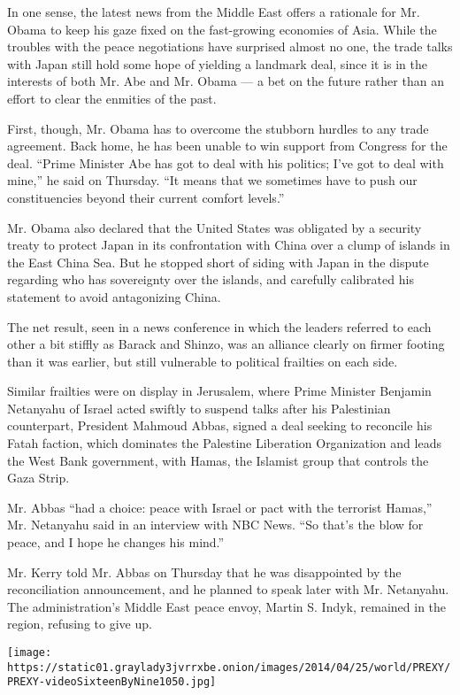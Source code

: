 In one sense, the latest news from the Middle East offers a rationale
for Mr. Obama to keep his gaze fixed on the fast-growing economies of
Asia. While the troubles with the peace negotiations have surprised
almost no one, the trade talks with Japan still hold some hope of
yielding a landmark deal, since it is in the interests of both Mr. Abe
and Mr. Obama --- a bet on the future rather than an effort to clear the
enmities of the past.

First, though, Mr. Obama has to overcome the stubborn hurdles to any
trade agreement. Back home, he has been unable to win support from
Congress for the deal. ``Prime Minister Abe has got to deal with his
politics; I've got to deal with mine,'' he said on Thursday. ``It means
that we sometimes have to push our constituencies beyond their current
comfort levels.''

Mr. Obama also declared that the United States was obligated by a
security treaty to protect Japan in its confrontation with China over a
clump of islands in the East China Sea. But he stopped short of siding
with Japan in the dispute regarding who has sovereignty over the
islands, and carefully calibrated his statement to avoid antagonizing
China.

The net result, seen in a news conference in which the leaders referred
to each other a bit stiffly as Barack and Shinzo, was an alliance
clearly on firmer footing than it was earlier, but still vulnerable to
political frailties on each side.

Similar frailties were on display in Jerusalem, where Prime Minister
Benjamin Netanyahu of Israel acted swiftly to suspend talks after his
Palestinian counterpart, President Mahmoud Abbas, signed a deal seeking
to reconcile his Fatah faction, which dominates the Palestine Liberation
Organization and leads the West Bank government, with Hamas, the
Islamist group that controls the Gaza Strip.

Mr. Abbas ``had a choice: peace with Israel or pact with the terrorist
Hamas,'' Mr. Netanyahu said in an interview with NBC News. ``So that's
the blow for peace, and I hope he changes his mind.''

Mr. Kerry told Mr. Abbas on Thursday that he was disappointed by the
reconciliation announcement, and he planned to speak later with Mr.
Netanyahu. The administration's Middle East peace envoy, Martin S.
Indyk, remained in the region, refusing to give up.

\texttt{[image: https://static01.graylady3jvrrxbe.onion/images/2014/04/25/world/PREXY/PREXY-videoSixteenByNine1050.jpg]}

